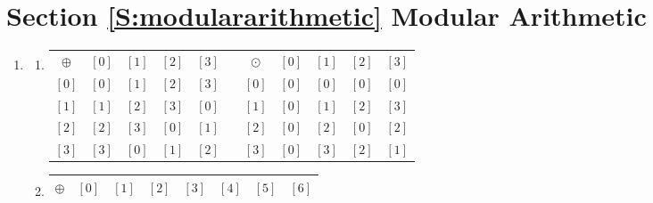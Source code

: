 \section*{Section \ref{S:modulararithmetic} Modular Arithmetic}

\begin{enumerate}

\item \begin{enumerate}
\item
\begin{tabular}{ c | c  c  c  c p{0.5in} c | c  c  c c}
$\oplus$ & $\left[ 0 \right]$ & $\left[ 1 \right]$ & $\left[ 2 \right]$ & $\left[ 3 \right]$ & &   $\odot$ & $\left[ 0 \right]$ & $\left[ 1 \right]$ & $\left[ 2 \right]$ & $\left[ 3 \right]$  \\ \cline{1-5} \cline{7-11}

$\left[ 0 \right]$ & $\left[ 0 \right]$ & $\left[ 1 \right]$ & $\left[ 2 \right]$ & $\left[ 3 \right]$&  & 
$\left[ 0 \right]$ & $\left[ 0 \right]$ & $\left[ 0 \right]$ & $\left[ 0 \right]$ & $\left[ 0 \right]$ 
\\ 

$\left[ 1 \right]$ & $\left[ 1 \right]$ & $\left[ 2 \right]$ & $\left[ 3 \right]$ & $\left[ 0 \right]$ &  & 
$\left[ 1 \right]$ & $\left[ 0 \right]$ & $\left[ 1 \right]$ & $\left[ 2 \right]$ & $\left[ 3 \right]$
\\ 

$\left[ 2 \right]$ & $\left[ 2 \right]$ & $\left[ 3 \right]$ & $\left[ 0 \right]$ & $\left[ 1 \right]$ &  & 
$\left[ 2 \right]$ & $\left[ 0 \right]$ & $\left[ 2 \right]$ & $\left[ 0 \right]$ & $\left[ 2 \right]$
\\ 

$\left[ 3 \right]$ & $\left[ 3 \right]$ & $\left[ 0 \right]$ & $\left[ 1 \right]$ & $\left[ 2 \right]$ &  & 
$\left[ 3 \right]$ & $\left[ 0 \right]$ & $\left[ 3 \right]$ & $\left[ 2 \right]$ & $\left[ 1 \right]$
\\ 

\end{tabular}

\item
\begin{tabular}{ c | c  c  c  c  c  c  c}
$\oplus$ & $\left[ 0 \right]$ & $\left[ 1 \right]$ & $\left[ 2 \right]$ & $\left[ 3 \right]$ & 
$\left[ 4 \right]$ & $\left[ 5 \right]$ & $\left[ 6 \right]$  \\ \hline


\end{tabular}
\end{enumerate}
\end{enumerate}
